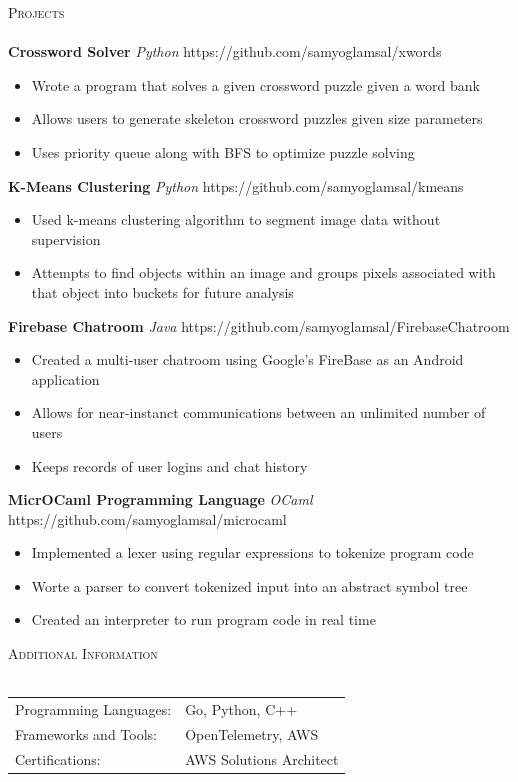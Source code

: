 \documentclass[a4paper]{article}
\newcommand{\lineunder} {
    \vspace*{-8pt} \\
    \hspace*{-18pt} \hrulefill \\
}
\newcommand{\header} [1] {
    {\hspace*{-18pt}\vspace*{6pt} \textsc{#1}}
    \vspace*{-6pt} \lineunder
}
\begin{document}
\header{Projects}
{\textbf{Crossword Solver}} {\sl Python} \hfill https://github.com/samyoglamsal/xwords\\
\vspace{-1mm}
\begin{itemize} \itemsep 1pt
    \item Wrote a program that solves a given crossword puzzle given a word bank
    \item Allows users to generate skeleton crossword puzzles given size parameters
    \item Uses priority queue along with BFS to optimize puzzle solving
\end{itemize}
\vspace*{2mm}
{\textbf{K-Means Clustering}} {\sl Python} \hfill https://github.com/samyoglamsal/kmeans\\
\vspace{-1mm}
\begin{itemize} \itemsep 1pt
    \item Used k-means clustering algorithm to segment image data without supervision
    \item Attempts to find objects within an image and groups pixels associated with that object into buckets
        for future analysis
\end{itemize}
\vspace*{2mm}
{\textbf{Firebase Chatroom}} {\sl Java} \hfill https://github.com/samyoglamsal/FirebaseChatroom\\
\vspace{-1mm} 
\begin{itemize} \itemsep 1pt
    \item Created a multi-user chatroom using Google's FireBase as an Android application
    \item Allows for near-instanct communications between an unlimited number of users
    \item Keeps records of user logins and chat history
\end{itemize}
\vspace*{2mm}
{\textbf{MicrOCaml Programming Language}} {\sl OCaml} \hfill https://github.com/samyoglamsal/microcaml
\vspace{-1mm}
\begin{itemize} \itemsep 1pt
    \item Implemented a lexer using regular expressions to tokenize program code
    \item Worte a parser to convert tokenized input into an abstract symbol tree
    \item Created an interpreter to run program code in real time
\end{itemize}
\vspace*{2mm}

\header{Additional Information}
\begin{tabular}{ l l }
	Programming Languages:   & Go, Python, C++ \\
	Frameworks and Tools:    & OpenTelemetry, AWS \\
	Certifications:          & AWS Solutions Architect \\
\end{tabular}
\vspace{2mm}
\end{document}

